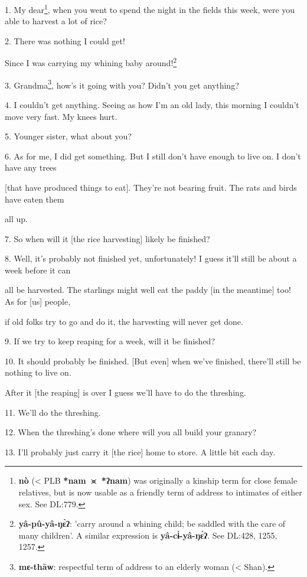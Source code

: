 \setcounter{footnote}{0}

1. My dear\footnote{\textbf{nò} (< PLB \textbf{*nam }$\glj$\textbf{ *ʔnam}) was originally a kinship term for close female relatives, but is now usable as a friendly term of address to intimates of either sex. See DL:779.}, when you went to spend the night in the fields this week, were
you able to harvest a lot of rice?

2. There was nothing I could get!

Since I was carrying my whining baby around!\footnote{\textbf{yâ-pû-yâ-ŋɛ̀ʔ}: 'carry around a whining child; be saddled with the care of many children'. A similar expression is \textbf{yâ-cɨ́-yâ-ŋɛ̀ʔ}. See DL:428, 1255, 1257.}

3. Grandma\footnote{\textbf{mɛ-thāw}: respectful term of address to an elderly woman (< Shan).}, how's it going with you? Didn't you get anything?

4. I couldn't get anything. Seeing as how I'm an old lady, this morning I couldn't
move very fast. My knees hurt.

5. Younger sister, what about you?

6. As for me, I did get something. But I still don't have enough to live on. I
don't have any trees

[that have produced things to eat]. They're not bearing fruit. The rats and birds
have eaten them

all up.

7. So when will it [the rice harvesting] likely be finished?

8. Well, it's probably not finished yet, unfortunately! I guess it'll still be
about a week before it can

all be harvested. The starlings might well eat the paddy [in the meantime] too!
As for [us] people,

if old folks try to go and do it, the harvesting will never get done.

9. If we try to keep reaping for a week, will it be finished?

10. It should probably be finished. [But even] when we've finished, there'll still
be nothing to live on.

After it [the reaping] is over I guess we'll have to do the threshing.

11. We'll do the threshing.

12. When the threshing's done where will you all build your granary?

13. I'll probably just carry it [the rice] home to store. A little bit each day.

